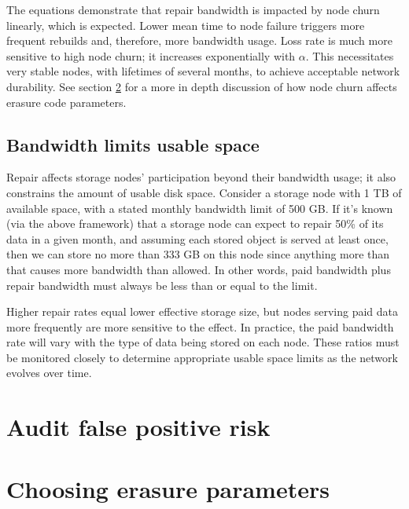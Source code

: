 \documentclass[8pt,fleqn,openany]{book}
\begin{document}
The equations demonstrate that repair bandwidth is impacted by node churn
linearly, which is expected.
Lower mean time to node failure triggers more frequent rebuilds and,
therefore, more bandwidth usage.
Loss rate is much more sensitive to high node churn; it increases
exponentially with $\alpha$.
This necessitates very stable nodes, with lifetimes of several months, to
achieve acceptable network durability.
See section \ref{sec:RS} for a more in depth discussion of how node churn
affects erasure code parameters.

\subsection{Bandwidth limits usable space}\label{sec:bandwidth-space-limits}

Repair affects storage nodes' participation beyond their bandwidth usage; it
also constrains the amount of usable disk space.
Consider a storage node with 1 TB of available space, with a stated monthly
bandwidth limit of 500 GB.
If it's known (via the above framework) that a storage node can expect to
repair 50\% of its data in a given month, and assuming each stored object
is served at least once, then we can store no more than 333 GB on this node
since anything more than that causes more bandwidth than allowed.
In other words, paid bandwidth plus repair bandwidth must always be less than
or equal to the limit.

Higher repair rates equal lower effective storage size, but nodes serving paid
data more frequently are more sensitive to the effect.
In practice, the paid bandwidth rate will vary with the type of data being
stored on each node.
These ratios must be monitored closely to determine appropriate usable space
limits as the network evolves over time.

\pagebreak
\section{Audit false positive risk}\label{sec:audit-false-positive}



\pagebreak
\section{Choosing erasure parameters}
\label{sec:RS}




\end{document}
